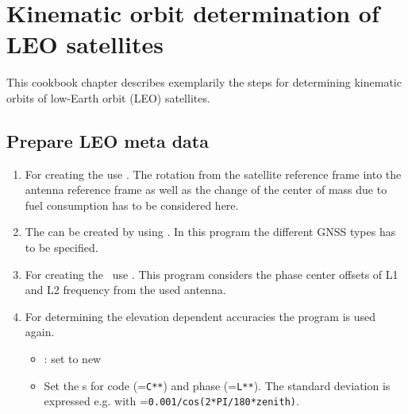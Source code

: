 \section{Kinematic orbit determination of LEO satellites}\label{cookbook.kinematicOrbit}

This cookbook chapter describes exemplarily the steps for determining kinematic orbits of low-Earth orbit (LEO) satellites.

\subsection{Prepare LEO meta data}
\begin{enumerate}
  \item For creating the  use . The rotation from the
  satellite reference frame into the antenna reference frame as well as the change of the center of mass due to fuel consumption has to be considered here.
  \item The  can be created by using . In this program the different GNSS types has to be specified.
  \item For creating the \ use . This program considers the phase center offsets of L1 and L2 frequency from the used antenna.
  \item For determining the elevation dependent accuracies the program  is used again.
  \begin{itemize}
    \item {}: set to new
    \item Set the s for code (=\verb|C**|) and phase
    (=\verb|L**|). The standard deviation is expressed e.g. with =\verb|0.001/cos(2*PI/180*zenith)|.
  \end{itemize}
\end{enumerate}


